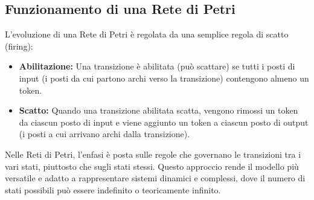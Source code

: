\subsection{Funzionamento di una Rete di Petri}
L'evoluzione di una Rete di Petri è regolata da una semplice regola di scatto (firing):
\begin{itemize}
    \item \textbf{Abilitazione:} Una transizione è abilitata (può scattare) se
          tutti i posti di input (i posti da cui partono archi verso la transizione)
          contengono almeno un token.
    \item \textbf{Scatto:} Quando una transizione abilitata scatta, vengono rimossi un
          token da ciascun posto di input e viene aggiunto un token a ciascun
          posto di output (i posti a cui arrivano archi dalla transizione).
\end{itemize}

Nelle Reti di Petri, l'enfasi è posta sulle regole che governano le transizioni
tra i vari stati, piuttosto che sugli stati stessi. Questo approccio rende il modello
più versatile e adatto a rappresentare sistemi dinamici e complessi, dove il numero di
stati possibili può essere indefinito o teoricamente infinito.
